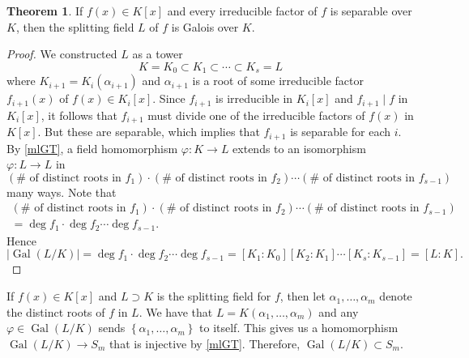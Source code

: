 \documentclass[10pt,letterpaper,cm]{nupset}
\theoremstyle{definition}
\theoremstyle{theorem}
\newtheorem{theorem}[definition]{Theorem}
\theoremstyle{remark}
\newcommand{\1}{\mathbf{1}}
\newcommand{\0}{\vec 0}
\DeclareMathOperator{\gal}{Gal}
\begin{document}
\begin{theorem}
If $f(x) \in K[x]$ and every irreducible factor of $f$ is separable over $K$, then the splitting field $L$ of $f$ is Galois over $K$.
\end{theorem}
\begin{proof}
We constructed $L$ as a tower $$K = K_0 \subset K_1 \subset \cdots \subset K_s = L$$ where $K_{i+1} = K_i(\alpha_{i+1})$ and $\alpha_{i+1}$  is a root of some irreducible factor $f_{i+1}(x)$ of $f(x)\in K_i[x]$. Since $f_{i+1}$ is irreducible in $K_i[x]$ and $f_{i+1} \mid f $ in $K_i[x]$, it follows that $f_{i+1}$ must divide one of the irreducible factors of $f(x)$ in $K[x]$. But these are separable, which implies that $f_{i+1}$ is separable for each $i$. By \cref{mlGT}, a field homomorphism $\varphi : K \to L$ extends to an isomorphism $\varphi : L \to L$ in $$\left(\# \text{ of distinct roots in } f_1\right) \cdot \left(\# \text{ of distinct roots in }f_2\right)\cdots \left(\# \text{ of distinct roots in }f_{s-1}\right)$$ many ways. Note that 
\begin{gather*}
\left(\# \text{ of distinct roots in } f_1\right) \cdot \left(\# \text{ of distinct roots in } f_2\right)\cdots \left(\# \text{ of distinct roots in } f_{s-1}\right) 
\\  = \deg{f_1}\cdot \deg{f_2} \cdots \deg{f_{s-1}}.
\end{gather*}
Hence $$\left\lvert{\gal(L/K)}\right\rvert = \deg{f_1}\cdot \deg{f_2} \cdots \deg{f_{s-1}} = \left[K_1: K_0\right]\left[K_2: K_1\right] \cdots \left[K_s: K_{s-1}\right] = \left[L:K\right].$$
\end{proof}

\smallskip

If $f(x) \in K[x]$ and $L \supset K$ is the splitting field for $f$, then let $\alpha_1, \ldots, \alpha_m$ denote the distinct roots of $f$ in $L$. We have that $L = K(\alpha_1, \ldots, \alpha_m)$ and any $\varphi \in \gal(L/K) $ sends $\left\{\alpha_1, \ldots, \alpha_m\right\}$ to itself. This gives us a homomorphism $\gal(L/K) \to S_m$ that is injective by \cref{mlGT}. Therefore, $\gal(L/K) \subset S_m$.
\end{document}
